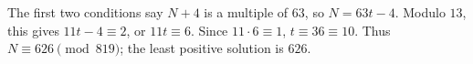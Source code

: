 The first two conditions say $N+4$ is a multiple of $63$, so $N=63t-4$. Modulo $13$, this gives $11t-4\equiv2$, or $11t\equiv6$. Since $11\cdot6\equiv1$, $t\equiv36\equiv10$. Thus $N\equiv626\pmod{819}$; the least positive solution is $\boxed{626}$.

